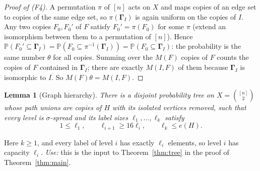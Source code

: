 \documentclass[11pt]{article}
\newtheorem{lemma}[theorem]{Lemma}
\numberwithin{equation}{section}
\newcommand{\PP}{\mathbb P}
\newcommand{\GG}{\boldsymbol\Gamma}
\begin{document}
\begin{proof}[Proof of (F4)]
A permutation $\pi$ of $[n]$ acts on $X$ and maps copies of an edge set
to copies of the same edge set, so $\pi(\GG_I)$ is again uniform on the
copies of $I$. Any two copies $F_0,F_0'$ of $F$ satisfy
$F_0'=\pi(F_0)$ for some $\pi$ (extend an isomorphism between them to a
permutation of $[n]$). Hence
$\PP(F_0'\subseteq\GG_I)=\PP(F_0\subseteq\pi^{-1}(\GG_I))
=\PP(F_0\subseteq\GG_I)$: the probability is the same number $\theta$
for all copies. Summing over the $M(F)$ copies of $F$ counts the copies
of $F$ contained in $\GG_I$; there are exactly $M(I,F)$ of them because
$\GG_I$ is isomorphic to $I$. So $M(F)\theta=M(I,F)$.
\end{proof}

\begin{lemma}[Graph hierarchy]\label{lem:hierarchy}
There is a disjoint probability tree on
$X=\binom{[n]}2$ whose path unions are copies of $H$ with its isolated
vertices removed, such that every level is $\sigma$-spread and its label
sizes $\ell_1,\ldots,\ell_k$ satisfy
\[
 1\le\ell_1,\qquad \ell_{i+1}\ge16\ell_i,
 \qquad \ell_k\le e(H).
\]
\end{lemma}

Here $k\ge1$, and every label of level $i$ has exactly $\ell_i$
elements, so level $i$ has capacity $\ell_i$. \emph{Use:} this is the
input to Theorem~\ref{thm:tree} in the proof of
Theorem~\ref{thm:main}.
\end{document}

